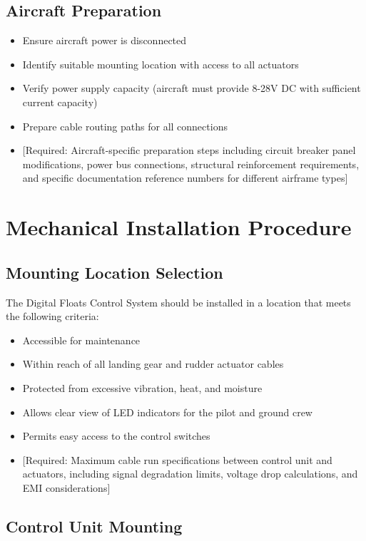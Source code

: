 \documentclass[12pt,a4paper,twoside,openright]{book}
\begin{document}
\subsection{Aircraft Preparation}
\begin{itemize}
    \item Ensure aircraft power is disconnected
    \item Identify suitable mounting location with access to all actuators
    \item Verify power supply capacity (aircraft must provide 8-28V DC with sufficient current capacity)
    \item Prepare cable routing paths for all connections
    \item {\color{missingred}[Required: Aircraft-specific preparation steps including circuit breaker panel modifications, power bus connections, structural reinforcement requirements, and specific documentation reference numbers for different airframe types]}
\end{itemize}

\section{Mechanical Installation Procedure}

\subsection{Mounting Location Selection}

The Digital Floats Control System should be installed in a location that meets the following criteria:
\begin{itemize}
    \item Accessible for maintenance
    \item Within reach of all landing gear and rudder actuator cables
    \item Protected from excessive vibration, heat, and moisture
    \item Allows clear view of LED indicators for the pilot and ground crew
    \item Permits easy access to the control switches
    \item {\color{missingred}[Required: Maximum cable run specifications between control unit and actuators, including signal degradation limits, voltage drop calculations, and EMI considerations]}
\end{itemize}

\subsection{Control Unit Mounting}
\end{document}
